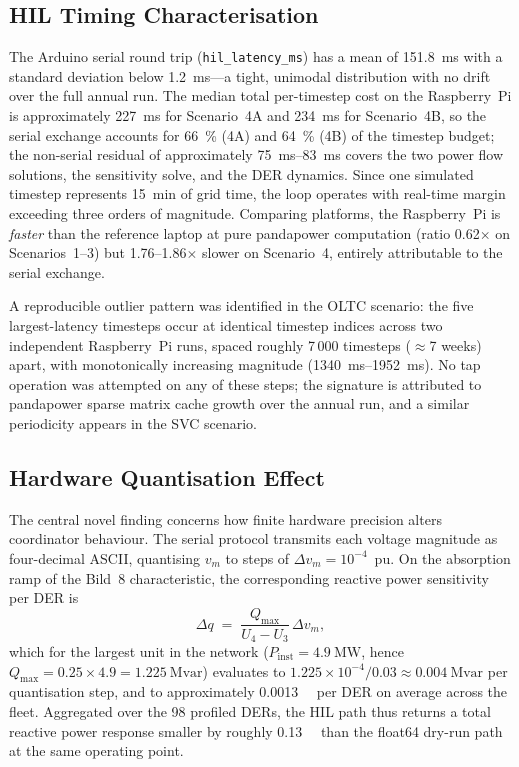 \documentclass[conference]{IEEEtran}
\begin{document}
\subsection{HIL Timing Characterisation}
\label{sec:timing}

The Arduino serial round trip (\texttt{hil\_latency\_ms}) has a mean of
\SI{151.8}{\milli\second} with a standard deviation below
\SI{1.2}{\milli\second}---a tight, unimodal distribution with no drift
over the full annual run. The median total per-timestep cost on the
Raspberry~Pi is approximately \SI{227}{\milli\second} for Scenario~4A and
\SI{234}{\milli\second} for Scenario~4B, so the serial exchange accounts
for \SI{66}{\percent} (4A) and \SI{64}{\percent} (4B) of the timestep
budget; the non-serial residual of approximately \SIrange{75}{83}{\milli\second}
covers the two power flow solutions, the sensitivity solve, and the DER
dynamics. Since one simulated timestep represents \SI{15}{\minute} of
grid time, the loop operates with real-time margin exceeding three
orders of magnitude. Comparing platforms, the Raspberry~Pi is
\emph{faster} than the reference laptop at pure pandapower computation
(ratio 0.62$\times$ on Scenarios~1--3) but 1.76--1.86$\times$ slower on
Scenario~4, entirely attributable to the serial exchange.

A reproducible outlier pattern was identified in the OLTC scenario: the
five largest-latency timesteps occur at identical timestep indices across
two independent Raspberry~Pi runs, spaced roughly 7\,000 timesteps
($\approx$7 weeks) apart, with monotonically increasing magnitude
(\SIrange{1340}{1952}{\milli\second}). No tap operation was attempted on
any of these steps; the signature is attributed to pandapower sparse
matrix cache growth over the annual run, and a similar periodicity
appears in the SVC scenario.

\subsection{Hardware Quantisation Effect}
\label{sec:quant}

The central novel finding concerns how finite hardware precision alters
coordinator behaviour. The serial protocol transmits each voltage
magnitude as four-decimal ASCII, quantising $v_m$ to steps of
$\Delta v_m = 10^{-4}$~pu. On the absorption ramp of the Bild~8
characteristic, the corresponding reactive power sensitivity per DER is
\begin{equation}
\Delta q \;=\; \frac{Q_\mathrm{max}}{U_4 - U_3}\,\Delta v_m ,
\label{eq:quant}
\end{equation}
which for the largest unit in the network ($P_\mathrm{inst} =
\SI{4.9}{\mega\watt}$, hence $Q_\mathrm{max} = 0.25 \times 4.9 =
\SI{1.225}{\mega\text{var}}$) evaluates to $1.225 \times 10^{-4} / 0.03
\approx \SI{0.004}{\mega\text{var}}$ per quantisation step, and to
approximately \SI{0.0013}{\mega{}} per DER on average across the
fleet. Aggregated over the 98 profiled DERs, the HIL path thus returns a
total reactive power response smaller by roughly
\SI{0.13}{\mega{}} than the float64 dry-run path at the same
operating point.
\end{document}
